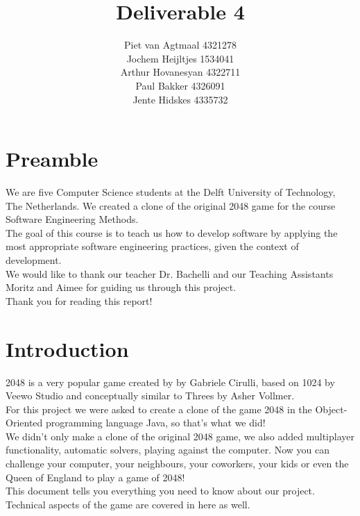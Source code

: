 \documentclass[a4paper,11pt,report]{scrartcl}
\title{\huge\textbf{Deliverable 4}}
\author{Piet van Agtmaal 4321278\\
	    Jochem Heijltjes 1534041\\
		Arthur Hovanesyan 4322711\\
		Paul Bakker 4326091\\
		Jente Hidskes 4335732
	   }
\begin{document}
\begin{titlepage}
\maketitle
\thispagestyle{empty} %
\end{titlepage}

\newpage\section{Preamble}

We are five Computer Science students at the Delft University of Technology,
The Netherlands. We created a clone of the original 2048 game for the course
Software Engineering Methods.\\

The goal of this course is to teach us how to develop software by applying the most appropriate software engineering practices, given the context of development.\\

We would like to thank our teacher Dr. Bachelli and our Teaching Assistants Moritz and Aimee for guiding us through this project.\\

Thank you for reading this report!\\

\newpage\section{Introduction}

2048 is a very popular game created by by Gabriele Cirulli, based on 1024 by
Veewo Studio and conceptually similar to Threes by Asher Vollmer.\\

For this project we were asked to create a clone of the game 2048 in the Object-Oriented programming language Java, so that's what we did!\\

We didn't only make a clone of the original 2048 game, we also added
multiplayer functionality, automatic solvers, playing against the computer. 
Now you can challenge your computer, your neighbours, your
coworkers, your kids or even the Queen of England to play a game of 2048!\\

This document tells you everything you need to know about our project. Technical aspects of
the game are covered in here as well.\\
\end{document}
